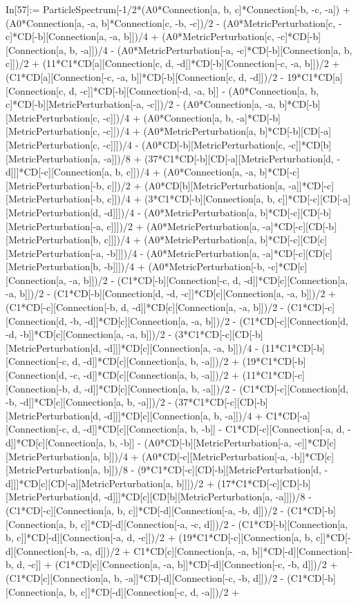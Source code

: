 In[57]:= ParticleSpectrum[-1/2*(A0*Connection[a, b, c]*Connection[-b, -c, -a]) + (A0*Connection[a, -a, b]*Connection[c, -b, -c])/2 - (A0*MetricPerturbation[c, -c]*CD[-b][Connection[a, -a, b]])/4 + (A0*MetricPerturbation[c, -c]*CD[-b][Connection[a, b, -a]])/4 - (A0*MetricPerturbation[-a, -c]*CD[-b][Connection[a, b, c]])/2 + (11*C1*CD[a][Connection[c, d, -d]]*CD[-b][Connection[-c, -a, b]])/2 + (C1*CD[a][Connection[-c, -a, b]]*CD[-b][Connection[c, d, -d]])/2 - 19*C1*CD[a][Connection[c, d, -c]]*CD[-b][Connection[-d, -a, b]] - (A0*Connection[a, b, c]*CD[-b][MetricPerturbation[-a, -c]])/2 - (A0*Connection[a, -a, b]*CD[-b][MetricPerturbation[c, -c]])/4 + (A0*Connection[a, b, -a]*CD[-b][MetricPerturbation[c, -c]])/4 + (A0*MetricPerturbation[a, b]*CD[-b][CD[-a][MetricPerturbation[c, -c]]])/4 - (A0*CD[-b][MetricPerturbation[c, -c]]*CD[b][MetricPerturbation[a, -a]])/8 + (37*C1*CD[-b][CD[-a][MetricPerturbation[d, -d]]]*CD[-c][Connection[a, b, c]])/4 + (A0*Connection[a, -a, b]*CD[-c][MetricPerturbation[-b, c]])/2 + (A0*CD[b][MetricPerturbation[a, -a]]*CD[-c][MetricPerturbation[-b, c]])/4 + (3*C1*CD[-b][Connection[a, b, c]]*CD[-c][CD[-a][MetricPerturbation[d, -d]]])/4 - (A0*MetricPerturbation[a, b]*CD[-c][CD[-b][MetricPerturbation[-a, c]]])/2 + (A0*MetricPerturbation[a, -a]*CD[-c][CD[-b][MetricPerturbation[b, c]]])/4 + (A0*MetricPerturbation[a, b]*CD[-c][CD[c][MetricPerturbation[-a, -b]]])/4 - (A0*MetricPerturbation[a, -a]*CD[-c][CD[c][MetricPerturbation[b, -b]]])/4 + (A0*MetricPerturbation[-b, -c]*CD[c][Connection[a, -a, b]])/2 - (C1*CD[-b][Connection[-c, d, -d]]*CD[c][Connection[a, -a, b]])/2 - (C1*CD[-b][Connection[d, -d, -c]]*CD[c][Connection[a, -a, b]])/2 + (C1*CD[-c][Connection[-b, d, -d]]*CD[c][Connection[a, -a, b]])/2 - (C1*CD[-c][Connection[d, -b, -d]]*CD[c][Connection[a, -a, b]])/2 - (C1*CD[-c][Connection[d, -d, -b]]*CD[c][Connection[a, -a, b]])/2 - (3*C1*CD[-c][CD[-b][MetricPerturbation[d, -d]]]*CD[c][Connection[a, -a, b]])/4 - (11*C1*CD[-b][Connection[-c, d, -d]]*CD[c][Connection[a, b, -a]])/2 + (19*C1*CD[-b][Connection[d, -c, -d]]*CD[c][Connection[a, b, -a]])/2 + (11*C1*CD[-c][Connection[-b, d, -d]]*CD[c][Connection[a, b, -a]])/2 - (C1*CD[-c][Connection[d, -b, -d]]*CD[c][Connection[a, b, -a]])/2 - (37*C1*CD[-c][CD[-b][MetricPerturbation[d, -d]]]*CD[c][Connection[a, b, -a]])/4 + C1*CD[-a][Connection[-c, d, -d]]*CD[c][Connection[a, b, -b]] - C1*CD[-c][Connection[-a, d, -d]]*CD[c][Connection[a, b, -b]] - (A0*CD[-b][MetricPerturbation[-a, -c]]*CD[c][MetricPerturbation[a, b]])/4 + (A0*CD[-c][MetricPerturbation[-a, -b]]*CD[c][MetricPerturbation[a, b]])/8 - (9*C1*CD[-c][CD[-b][MetricPerturbation[d, -d]]]*CD[c][CD[-a][MetricPerturbation[a, b]]])/2 + (17*C1*CD[-c][CD[-b][MetricPerturbation[d, -d]]]*CD[c][CD[b][MetricPerturbation[a, -a]]])/8 - (C1*CD[-c][Connection[a, b, c]]*CD[-d][Connection[-a, -b, d]])/2 - (C1*CD[-b][Connection[a, b, c]]*CD[-d][Connection[-a, -c, d]])/2 - (C1*CD[-b][Connection[a, b, c]]*CD[-d][Connection[-a, d, -c]])/2 + (19*C1*CD[-c][Connection[a, b, c]]*CD[-d][Connection[-b, -a, d]])/2 + C1*CD[c][Connection[a, -a, b]]*CD[-d][Connection[-b, d, -c]] + (C1*CD[c][Connection[a, -a, b]]*CD[-d][Connection[-c, -b, d]])/2 + (C1*CD[c][Connection[a, b, -a]]*CD[-d][Connection[-c, -b, d]])/2 - (C1*CD[-b][Connection[a, b, c]]*CD[-d][Connection[-c, d, -a]])/2 + 